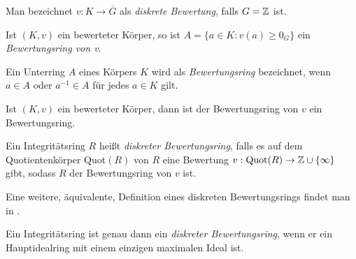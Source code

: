 Man bezeichnet $v\colon K \to \overline{G} $ als \textit{diskrete Bewertung}, falls ${G} = \mathbb{Z}$ ist.
%
%
%
%
%
%
% 
\begin{defn}\label{BewertungsringVonBewertung} %
Ist $\left(K, v\right)$ ein bewerteter Körper, so ist $A = \lbrace  a \in K\colon v(a) \geq 0_G\rbrace$ ein \textit{Bewertungsring von v}.

\end{defn}
%
%
%
%
% 
%
\begin{defn} %
Ein Unterring $A$ eines Körpers $K$ wird als \textit{Bewertungsring} bezeichnet, wenn $a \in A$ oder $a^{-1}\in A$ für jedes $a\in K$ gilt.
\end{defn}
\begin{bem} %
Ist $\left(K, v\right)$ ein bewerteter Körper, dann ist der Bewertungsring von $v$ ein Bewertungsring.
\end{bem}
\begin{defn}   %
Ein Integritätsring $R$ heißt \textit{diskreter Bewertungsring}, falls es auf dem Quotientenkörper \textup{Quot}$(R)$ von $R$ eine Bewertung $v: \textup{Quot}(R) \rightarrow \mathbb{Z} \cup \lbrace\infty\rbrace$ gibt, sodass $R$
der Bewertungsring von $v$ ist.
\end{defn}
Eine weitere, äquivalente, Definition eines diskreten Bewertungsrings findet man in \cite[S. 126]{neukirch92}.
\begin{bem} \label{bewertungsring}%
Ein Integritätsring ist genau dann ein \textit{diskreter Bewertungsring}, wenn er ein Hauptidealring mit einem einzigen maximalen Ideal ist.
\end{bem} 
